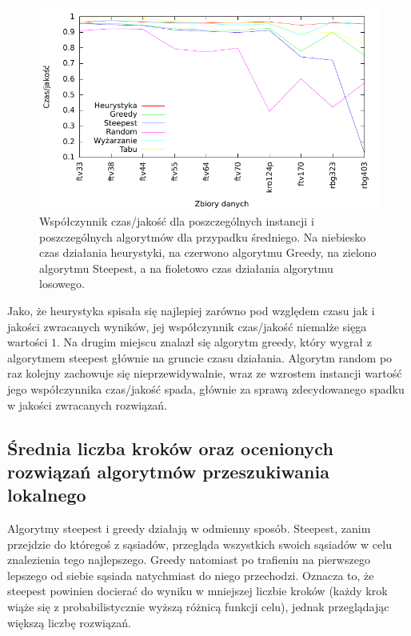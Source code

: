 \begin{figure}[!h]
\centering\includegraphics[width=12cm]{img/jakosc-czas}
\caption{Współczynnik czas/jakość dla poszczególnych instancji i poszczególnych algorytmów dla przypadku średniego. Na niebiesko czas działania heurystyki, na czerwono algorytmu Greedy, na zielono algorytmu Steepest, a na fioletowo czas działania algorytmu losowego.}\label{rys:czas_jakosc}
\end{figure}

Jako, że heurystyka spisała się najlepiej zarówno pod względem czasu jak i jakości zwracanych wyników, jej współczynnik czas/jakość niemalże sięga wartości $1$. Na drugim miejscu znalazł się algorytm greedy, który wygrał z algorytmem steepest głównie na gruncie czasu działania. Algorytm random po raz kolejny zachowuje się nieprzewidywalnie, wraz ze wzrostem instancji wartość jego współczynnika czas/jakość spada, głównie za sprawą zdecydowanego spadku w jakości zwracanych rozwiązań.

\subsection{Średnia liczba kroków oraz ocenionych rozwiązań algorytmów przeszukiwania lokalnego}
Algorytmy steepest i greedy działają w odmienny sposób. Steepest, zanim przejdzie do któregoś z sąsiadów, przegląda wszystkich swoich sąsiadów w celu znalezienia tego najlepszego. Greedy natomiast po trafieniu na pierwszego lepszego od siebie sąsiada natychmiast do niego przechodzi. Oznacza to, że steepest powinien docierać do wyniku w mniejszej liczbie kroków (każdy krok wiąże się z probabilistycznie wyższą różnicą funkcji celu), jednak przeglądając większą liczbę rozwiązań.


